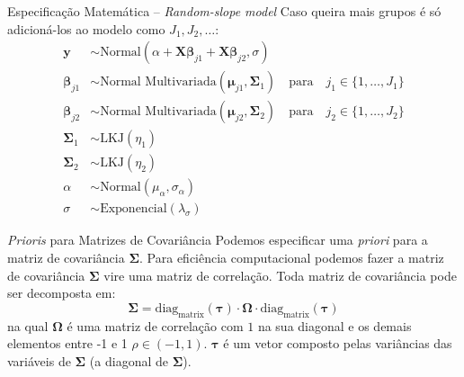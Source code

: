 \begin{frame}{Especificação Matemática -- \textit{Random-slope model}}
  Caso queira mais grupos é só adicioná-los ao modelo como $J_1, J_2, \dots$:
  $$
  \begin{aligned}
  \boldsymbol{y} &\sim \text{Normal}(\alpha + \mathbf{X} \boldsymbol{\beta}_{j1} + \mathbf{X} \boldsymbol{\beta}_{j2}, \sigma) \\
  \boldsymbol{\beta}_{j1} &\sim \text{Normal Multivariada}(\boldsymbol{\mu}_{j1}, \boldsymbol{\Sigma}_1)
  \quad \text{para}\quad j_1 \in \{ 1, \dots, J_1 \} \\
  \boldsymbol{\beta}_{j2} &\sim \text{Normal Multivariada}(\boldsymbol{\mu}_{j2}, \boldsymbol{\Sigma}_2)
  \quad \text{para}\quad j_2 \in \{ 1, \dots, J_2 \} \\
  \boldsymbol{\Sigma}_1 &\sim \text{LKJ}(\eta_1) \\
  \boldsymbol{\Sigma}_2 &\sim \text{LKJ}(\eta_2) \\
  \alpha &\sim \text{Normal}(\mu_\alpha, \sigma_\alpha) \\
  \sigma &\sim \text{Exponencial}(\lambda_\sigma)
  \end{aligned}
  $$
\end{frame}

\begin{frame}{\textit{Prioris} para Matrizes de Covariância}
  Podemos especificar uma \textit{priori} para a matriz de covariância
  $\boldsymbol{\Sigma}$.
  \vfill
  Para eficiência computacional podemos fazer a matriz de covariância
  $\boldsymbol{\Sigma}$ vire uma matriz de correlação. Toda matriz de
  covariância pode ser decomposta em:
  $$
  \boldsymbol{\Sigma}=\text{diag}_\text{matrix}(\boldsymbol{\tau}) \cdot \boldsymbol{\Omega} \cdot \text{diag}_\text{matrix}(\boldsymbol{\tau})
  $$
  na qual $\boldsymbol{\Omega}$ é uma matriz de correlação com
  $1$ na sua diagonal e os demais elementos entre -1 e 1 $\rho \in (-1, 1)$.
  $\boldsymbol{\tau}$ é um vetor composto pelas variâncias das variáveis de
  $\boldsymbol{\Sigma}$ (a diagonal de $\boldsymbol{\Sigma}$).
\end{frame}

